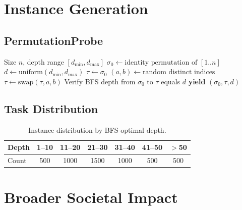 \documentclass{article}
\theoremstyle{plain}
\theoremstyle{definition}
\theoremstyle{remark}
\begin{document}

\section{Instance Generation}
\label{app:instances}

\subsection{PermutationProbe}

\begin{algorithm}[h]
\caption{PermutationProbe Instance Generation}
\begin{algorithmic}[1]
\REQUIRE Size $n$, depth range $[d_{\min}, d_{\max}]$
    \STATE $\sigma_0 \leftarrow \text{identity permutation of } [1..n]$
    \STATE $d \leftarrow \text{uniform}(d_{\min}, d_{\max})$
    \STATE $\tau \leftarrow \sigma_0$
        \STATE $(a, b) \leftarrow \text{random distinct indices}$
        \STATE $\tau \leftarrow \text{swap}(\tau, a, b)$
    \ENDFOR
    \STATE Verify BFS depth from $\sigma_0$ to $\tau$ equals $d$
    \STATE \textbf{yield} $(\sigma_0, \tau, d)$
\ENDFOR
\end{algorithmic}
\end{algorithm}

\subsection{Task Distribution}

\begin{table}[h]
\centering
\caption{Instance distribution by BFS-optimal depth.}
\label{tab:instances}
\small
\begin{tabular}{@{}lcccccc@{}}
\toprule
\textbf{Depth} & 1--10 & 11--20 & 21--30 & 31--40 & 41--50 & $>$50 \\
\midrule
Count & 500 & 1000 & 1500 & 1000 & 500 & 500 \\
\bottomrule
\end{tabular}
\end{table}


\section{Broader Societal Impact}
\label{app:impact}
\end{document}
